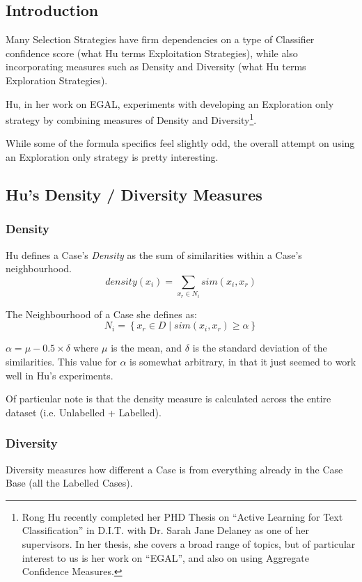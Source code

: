 \documentclass[a4paper,11pt]{report}
\begin{document}
\subsection{Introduction}
Many Selection Strategies have firm dependencies on a type of Classifier confidence score (what Hu terms Exploitation Strategies), while also incorporating measures such as Density and Diversity (what Hu terms Exploration Strategies).

Hu, in her work on EGAL, experiments with developing an Exploration only strategy by combining measures of Density and Diversity\footnote{Rong Hu recently completed her PHD Thesis on ``Active Learning for Text Classification'' in D.I.T. with Dr. Sarah Jane Delaney as one of her supervisors\cite{Hu2011}. In her thesis, she covers a broad range of topics, but of particular interest to us is her work on ``EGAL'', and also on using Aggregate Confidence Measures.}.

While some of the formula specifics feel slightly odd, the overall attempt on using an Exploration only strategy is pretty interesting. 

\subsection{Hu's Density / Diversity Measures}

\subsubsection{Density}
Hu defines a Case's \emph{Density} as the sum of similarities within a Case's neighbourhood.
\[
density(x_{i})=\underset{x_{r}\in N_{i}}{\sum}sim(x_{i},x_{r})
\]

The Neighbourhood of a Case she defines as:
\[
N_{i}=\left\{ x_{r}\in D\mid sim(x_{i},x_{r})\geq\alpha\right\} 
\]

$\alpha=\mu-0.5\times\delta$ where $\mu$ is the mean, and $\delta$ is the standard deviation of the similarities. This value for $\alpha$ is somewhat arbitrary, in that it just seemed to work well in Hu's experiments.

Of particular note is that the density measure is calculated across the entire dataset (i.e. Unlabelled + Labelled). 

\subsubsection{Diversity}

Diversity measures how different a Case is from everything already in the Case Base (all the Labelled Cases).
\end{document}
